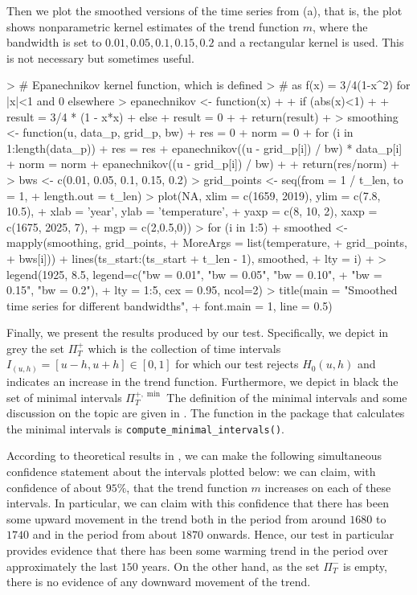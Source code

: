 \documentclass[a4paper]{article}
\begin{document}
Then we plot the smoothed versions of the time series from (a), that is, the plot shows nonparametric kernel estimates of the trend function $m$, where the bandwidth is set to $0.01, 0.05, 0.1, 0.15, 0.2$ and a rectangular kernel is used. This is not necessary but sometimes useful.
\begin{Schunk}
\begin{Sinput}
> # Epanechnikov kernel function, which is defined
> # as f(x) = 3/4(1-x^2) for |x|<1 and 0 elsewhere
> epanechnikov <- function(x)
+ {
+   if (abs(x)<1)
+   {
+     result = 3/4 * (1 - x*x)
+   } else {
+     result = 0
+   }
+   return(result)
+ }
> smoothing <- function(u, data_p, grid_p, bw){
+   res = 0
+   norm = 0
+   for (i in 1:length(data_p)){
+     res = res + epanechnikov((u - grid_p[i]) / bw) * data_p[i]
+     norm = norm + epanechnikov((u - grid_p[i]) / bw)
+   }
+   return(res/norm)
+ }
> bws <- c(0.01, 0.05, 0.1, 0.15, 0.2)
> grid_points <- seq(from = 1 / t_len, to = 1,
+                    length.out = t_len)
> plot(NA, xlim = c(1659, 2019), ylim = c(7.8, 10.5),
+      xlab = 'year', ylab = 'temperature',
+      yaxp  = c(8, 10, 2), xaxp = c(1675, 2025, 7),
+      mgp = c(2,0.5,0))
> for (i in 1:5){
+     smoothed <- mapply(smoothing, grid_points,
+                        MoreArgs = list(temperature,
+                                        grid_points,
+                                        bws[i]))
+     lines(ts_start:(ts_start + t_len - 1), smoothed,
+           lty = i)
+   }
> legend(1925, 8.5, legend=c("bw = 0.01", "bw = 0.05", "bw = 0.10",
+                            "bw = 0.15", "bw = 0.2"),
+        lty = 1:5, cex = 0.95, ncol=2)
> title(main = "Smoothed time series for different bandwidths",
+       font.main = 1, line = 0.5)
\end{Sinput}
\end{Schunk}

Finally, we present the results produced by our test. Specifically, we depict in grey the set $\Pi^{+}_T$ which is the collection of time intervals $I_{(u,h)} = [u - h, u + h] \in [0, 1]$ for which our test rejects $H_0(u,h)$ and indicates an increase in the trend function. Furthermore, we depict in black the set of minimal intervals $\Pi^{+, \min}_T$ The definition of the minimal intervals and some discussion on the topic are given in \cite{KhismatullinaVogt2020}. The function in the package that calculates the minimal intervals is \verb|compute_minimal_intervals()|.


According to theoretical results in \cite{KhismatullinaVogt2020}, we can make the following simultaneous confidence statement about the intervals plotted below: we can claim, with confidence of about $95\%$, that the trend function $m$ increases on each of these intervals. In particular, we can claim with this confidence that there has been some upward movement in the trend both in the period from around $1680$ to $1740$ and in the period from about $1870$ onwards. Hence, our test in particular provides evidence that there has been some warming trend in the period over approximately the last $150$ years. On the other hand, as the set $\Pi_T^-$ is empty, there is no evidence of any downward movement of the trend.
\end{document}
